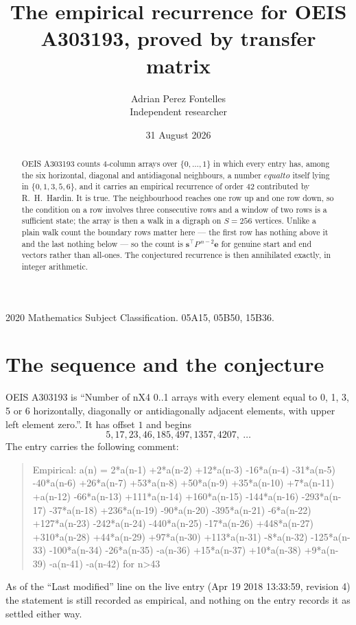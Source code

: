 \documentclass[11pt,a4paper]{article}
\title{The empirical recurrence for OEIS A303193, proved by transfer matrix}
\author{Adrian Perez Fontelles\\ \small Independent researcher}
\date{31 August 2026}
\theoremstyle{plain}
\theoremstyle{definition}
\begin{document}
\maketitle

\begin{abstract}
OEIS A303193 counts $4$-column arrays over $\{0,\dots,1\}$ in which every entry has,
among the six horizontal, diagonal and antidiagonal neighbours, a number $equal to$ itself lying in $\{0,1,3,5,6\}$, and it carries an empirical
recurrence of order $42$ contributed by R.~H.~Hardin. It is true. The neighbourhood
reaches one row up and one row down, so the condition on a row involves three consecutive
rows and a window of two rows is a sufficient state; the array is then a walk in a digraph
on $S=256$ vertices. Unlike a plain walk count the boundary rows matter here --- the first
row has nothing above it and the last nothing below --- so the count is
$\mathbf{s}^{\!\top}P^{\,n-2}\mathbf{e}$ for genuine start and end vectors rather than
all-ones. The conjectured recurrence is then annihilated exactly, in integer arithmetic.
\end{abstract}

\noindent\small 2020 Mathematics Subject Classification. 05A15, 05B50, 15B36.\normalsize

\section{The sequence and the conjecture}

OEIS A303193 is ``Number of nX4 0..1 arrays with every element equal to 0, 1, 3, 5 or 6 horizontally, diagonally or antidiagonally adjacent elements, with upper left element zero.''. It has offset
$1$ and begins
\[
5, 17, 23, 46, 185, 497, 1357, 4207,\ \dots
\]
The entry carries the following comment:
\begin{quote}\small
Empirical: a(n) = 2*a(n-1) +2*a(n-2) +12*a(n-3) -16*a(n-4) -31*a(n-5) -40*a(n-6) +26*a(n-7) +53*a(n-8) +50*a(n-9) +35*a(n-10) +7*a(n-11) +a(n-12) -66*a(n-13) +111*a(n-14) +160*a(n-15) -144*a(n-16) -293*a(n-17) -37*a(n-18) +236*a(n-19) -90*a(n-20) -395*a(n-21) -6*a(n-22) +127*a(n-23) -242*a(n-24) -440*a(n-25) -17*a(n-26) +448*a(n-27) +310*a(n-28) +44*a(n-29) +97*a(n-30) +113*a(n-31) -8*a(n-32) -125*a(n-33) -100*a(n-34) -26*a(n-35) -a(n-36) +15*a(n-37) +10*a(n-38) +9*a(n-39) -a(n-41) -a(n-42) for n>43
\end{quote}
As of the ``Last modified'' line on the live entry (Apr 19 2018 13:33:59, revision
4) the statement is still recorded as empirical, and nothing on the entry
records it as settled either way.
\end{document}
